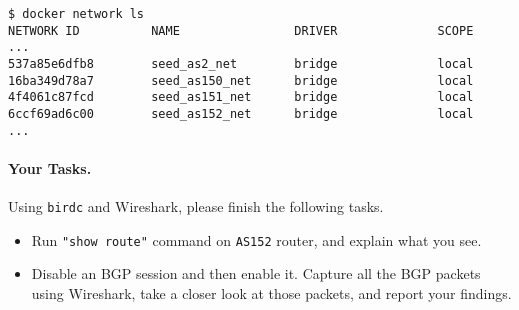 \begin{lstlisting}
$ docker network ls
NETWORK ID          NAME                DRIVER              SCOPE
...
537a85e6dfb8        seed_as2_net        bridge              local
16ba349d78a7        seed_as150_net      bridge              local
4f4061c87fcd        seed_as151_net      bridge              local
6ccf69ad6c00        seed_as152_net      bridge              local
...
\end{lstlisting}
 


\paragraph{Your Tasks.} Using \texttt{birdc} and Wireshark, please finish the 
following tasks. 

\begin{itemize}
\item Run \texttt{"show route"} command on \texttt{AS152} router, 
and explain what you see. 

\item Disable an BGP session and then enable it. Capture all the BGP packets 
using Wireshark, take a closer look at those packets, and report your 
findings. 
\end{itemize}




\begin{comment}
\subsection{Task 3.6. Making the Transit AS More Complicated} 

Create multiple network in AS2. 
While this is doable, the complexity will increase quite significantly,
because OSPF protocol is non-trivial. It may not be a good idea
to introduce it.

Actually, we can simplify the internal topology of a transit AS.
Instead of using multiple networks, we can put all the BGP routers 
on the same LAN.  
\end{comment}
 


